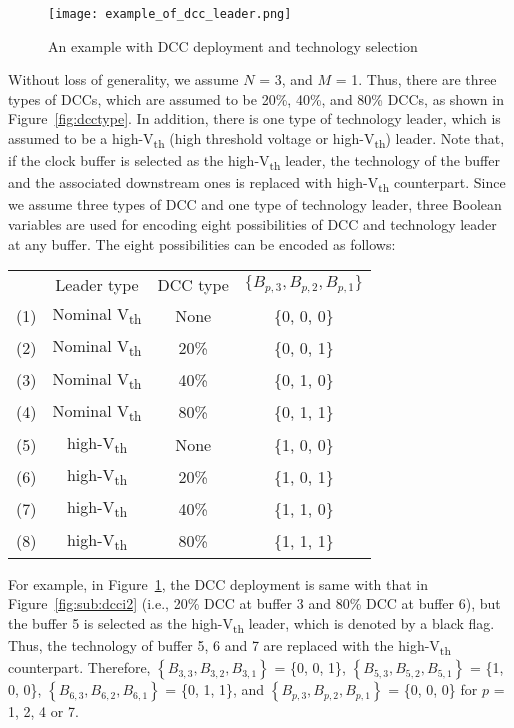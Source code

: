 \begin{figure}
    \centering
    \texttt{[image: example\_of\_dcc\_leader.png]}
    \caption{An example with DCC deployment and technology selection}
    \label{fig:example_dcc_tva}
\end{figure}

Without loss of generality, we assume $N$ = 3, and $M$ = 1. Thus, there are three types of DCCs, which are assumed to be 20\%, 40\%, and 80\% DCCs, as shown in Figure~\ref{fig:dcctype}. In addition, there is one type of technology leader, which is assumed to be a high-V\textsubscript{th} (high threshold voltage or high-V\textsubscript{th}) leader. Note that, if the clock buffer is selected as the high-V\textsubscript{th} leader, the technology of the buffer and the associated downstream ones is replaced with high-V\textsubscript{th} counterpart. Since we assume three types of DCC and one type of technology leader, three Boolean variables are used for encoding eight possibilities of DCC and technology leader at any buffer. The eight possibilities can be encoded as follows:

\begin{tabular}{  c  c  c  c  }
  	 & Leader type & DCC type & $\{B_{p,3}, B_{p,2}, B_{p,1}\}$ \\ 
  	(1)\quad & Nominal V\textsubscript{th} & None & \{0, 0, 0\} \\ 
  	(2)\quad & Nominal V\textsubscript{th} &20\% &  \{0, 0, 1\} \\ 
  	(3)\quad & Nominal V\textsubscript{th} &40\% &  \{0, 1, 0\} \\ 
  	(4)\quad & Nominal V\textsubscript{th} &80\% &  \{0, 1, 1\} \\ 
	(5)\quad & high-V\textsubscript{th} & None & \{1, 0, 0\} \\ 
  	(6)\quad & high-V\textsubscript{th} & 20\% &  \{1, 0, 1\} \\ 
  	(7)\quad & high-V\textsubscript{th} & 40\% &  \{1, 1, 0\} \\ 
  	(8)\quad & high-V\textsubscript{th} & 80\% &  \{1, 1, 1\} \\ 
\end{tabular}


For example, in Figure~\ref{fig:example_dcc_tva}, the DCC deployment is same with that in Figure~\ref{fig:sub:dcci2} (i.e., 20\% DCC at buffer 3 and 80\% DCC at buffer 6), but the buffer 5 is selected as the high-V\textsubscript{th} leader, which is denoted by a black flag. Thus, the technology of buffer 5, 6 and 7 are replaced with the high-V\textsubscript{th} counterpart. Therefore, $\left\{B_{3,3}, B_{3,2}, B_{3,1}\right\}$ = \{0, 0, 1\}, $\left\{B_{5,3}, B_{5,2}, B_{5,1}\right\}$ = \{1, 0, 0\}, $\left\{B_{6,3}, B_{6,2}, B_{6,1}\right\}$ = \{0, 1, 1\}, and $\left\{B_{p,3}, B_{p,2}, B_{p,1}\right\}$ = \{0, 0, 0\} for $p$ = 1, 2, 4 or 7.

